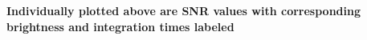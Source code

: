 {\bf Individually plotted above are SNR values with corresponding brightness and integration times labeled\label{fig:SNR_bright}}
